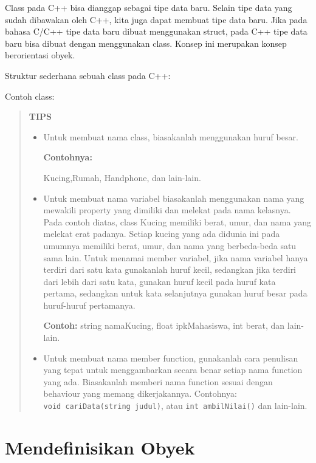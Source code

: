 Class pada C++ bisa dianggap sebagai tipe data baru. Selain tipe data
yang sudah dibawakan oleh C++, kita juga dapat membuat tipe data baru.
Jika pada bahasa C/C++ tipe data baru dibuat menggunakan struct, pada
C++ tipe data baru bisa dibuat dengan menggunakan class. Konsep ini
merupakan konsep berorientasi obyek.

Struktur sederhana sebuah class pada C++:



Contoh class:



\begin{quotation}
{\LARGE {}} \textbf{TIPS}

\begin{itemize}
\item Untuk membuat
nama class, biasakanlah menggunakan huruf besar.

\textbf{Contohnya:}

 Kucing,Rumah, Handphone, dan lain-lain.

\item Untuk membuat nama
variabel biasakanlah menggunakan nama yang mewakili property yang
dimiliki dan melekat pada nama kelasnya. Pada contoh diatas, class
Kucing memiliki berat, umur, dan nama yang melekat erat padanya. Setiap
kucing yang ada didunia ini pada umumnya memiliki berat, umur, dan nama
yang berbeda-beda satu sama lain. Untuk menamai member variabel, jika
nama variabel hanya terdiri dari satu kata gunakanlah huruf kecil,
sedangkan jika terdiri dari lebih dari satu kata, gunakan huruf kecil
pada huruf kata pertama, sedangkan untuk kata selanjutnya gunakan huruf
besar pada huruf-huruf pertamanya.

 \textbf{Contoh: }string namaKucing, float
ipkMahasiswa, int berat, dan lain-lain.

\item Untuk membuat
nama member function, gunakanlah cara penulisan yang tepat untuk
menggambarkan secara benar setiap nama function yang ada. Biasakanlah
memberi nama function sesuai dengan behaviour yang memang dikerjakannya.
Contohnya: \texttt{void\ cariData(string\ judul)}, atau
 \texttt{int\ ambilNilai()} dan lain-lain.
 \end{itemize}

	\end{quotation}


\section{Mendefinisikan Obyek}\label{mendefinisikan-obyek}

